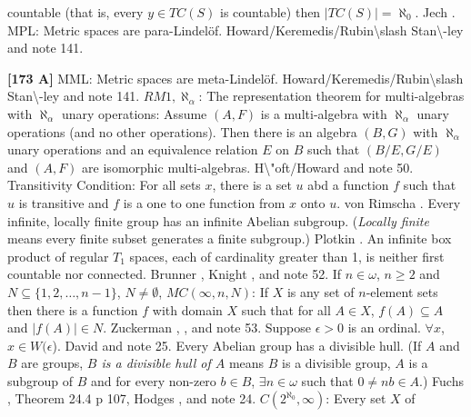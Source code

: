 countable  (that is, every $y\in TC(S)$ is countable) then $|TC(S)|=
\aleph_{0}$. \ac{Jech} \cite{1982}.
\medskip
{}  MPL: Metric spaces are para-Lindel\"of.
\ac{Howard/Keremedis/Rubin\slash Stan\-ley} \cite{1999} and note 141.
\smallskip
\item{}{\bf [173 A]}  MML: Metric spaces are meta-Lindel\"of.
\ac{Howard/Keremedis/Rubin\slash Stan\-ley} \cite{1999} and note 141.
\medskip
{} $RM1,\aleph_{\alpha }$: The
representation theorem for multi-algebras with $\aleph_{\alpha }$
unary operations:  Assume $(A,F)$ is  a  multi-algebra  with
$\aleph_{\alpha }$ unary operations (and no other operations).
Then  there  is  an  algebra $(B,G)$  with $\aleph_{\alpha }$
unary operations and an equivalence relation $E$ on $B$ such that
$(B/E,G/E)$ and $(A,F)$ are isomorphic multi-algebras.
\ac{H\"oft/Howard} \cite{1981} and note 50.
\medskip
{} Transitivity Condition: For all sets $x$, there is
a set $u$ abd a function $f$ such that $u$ is transitive and $f$ is a one
to one function from $x$ onto $u$.  von \ac{Rimscha} \cite{1982}.
\medskip
{} Every infinite, locally finite group has an
infinite Abelian subgroup. ({\it Locally finite} means every finite subset
generates a finite subgroup.)  \ac{Plotkin} \cite{1981}.
\medskip
{}  An infinite box product of regular $T_1$ spaces,
each of cardinality greater than 1, is neither first countable nor
connected.  \ac{Brunner} \cite{1981a}, \ac{Knight} \cite{1964}, and
note 52.
\medskip
{} If  $n\in\omega$, $n\ge 2$ and
$N \subseteq \{ 1, 2, \ldots , n-1 \}$, $N \neq\emptyset$,
$MC(\infty,n, N)$:  If $X$ is any set of $n$-element sets then  there
is  a function $f$ with domain $X$ such that for all $A\in X$,
$f(A)\subseteq A$ and $|f(A)|\in N$. \ac{Zuckerman} \cite{1969a},
\cite{1981}, and note 53.
\medskip
{} Suppose  $\epsilon > 0$ is an ordinal.
$\forall x$, $x\in W(\epsilon$). \ac{David} \cite{1980} and note 25.
\medskip
{} Every Abelian group has a divisible
hull.  (If $A$ and $B$  are groups, {\it $B$ is a divisible hull of $A$}
means $B$ is a divisible group, $A$ is a subgroup of $B$ and for
every non-zero $b \in  B$, $\exists  n \in \omega $  such
that $0\neq nb\in A$.)  \ac{Fuchs} \cite{1970}, Theorem 24.4 p 107,
\ac{Hodges} \cite{1980}, and note 24.
\medskip
{} $C(2^{\aleph_0},\infty)$: Every set $X$ of
